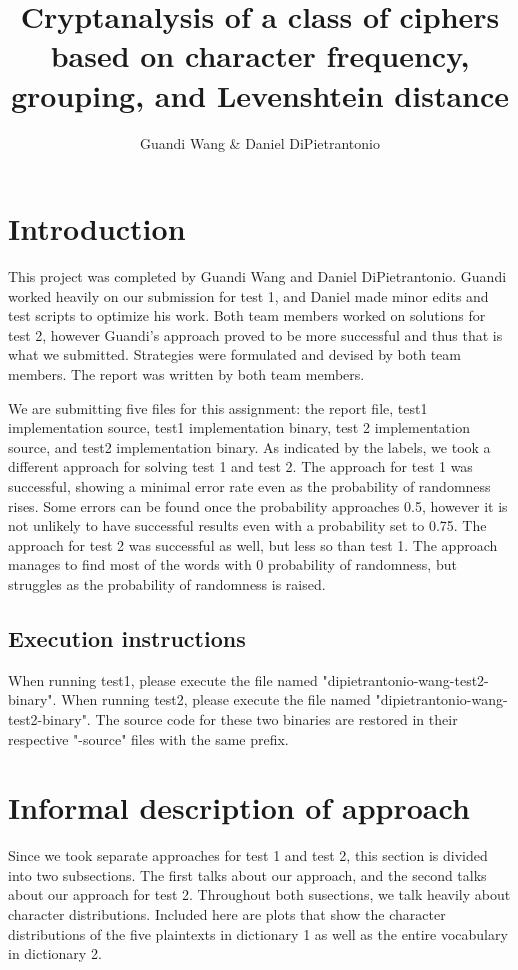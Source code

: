 \documentclass[12pt]{article}
\begin{document}
\title{Cryptanalysis of a class of ciphers based on character frequency, grouping, and Levenshtein distance}
\author{Guandi Wang \& Daniel DiPietrantonio}
\maketitle

\pagebreak

\section{Introduction}
This project was completed by Guandi Wang and Daniel DiPietrantonio. Guandi worked heavily on our submission for test 1, and Daniel made minor edits and test scripts to optimize his work. Both team members worked on solutions for test 2, however Guandi's approach proved to be more successful and thus that is what we submitted. Strategies were formulated and devised by both team members. The report was written by both team members.

We are submitting five files for this assignment: the report file, test1 implementation source, test1 implementation binary, test 2 implementation source, and test2 implementation binary. As indicated by the labels, we took a different approach for solving test 1 and test 2. The approach for test 1 was successful, showing a minimal error rate even as the probability of randomness rises. Some errors can be found once the probability approaches 0.5, however it is not unlikely to have successful results even with a probability set to 0.75. The approach for test 2 was successful as well, but less so than test 1. The approach manages to find most of the words with 0 probability of randomness, but struggles as the probability of randomness is raised.

\subsection{Execution instructions}
When running test1, please execute the file named "dipietrantonio-wang-test2-binary". When running test2, please execute the file named "dipietrantonio-wang-test2-binary". The source code for these two binaries are restored in their respective "-source" files with the same prefix.

\section{Informal description of approach}
Since we took separate approaches for test 1 and test 2, this section is divided into two subsections. The first talks about our approach, and the second talks about our approach for test 2. Throughout both susections, we talk heavily about character distributions. Included here are plots that show the character distributions of the five plaintexts in dictionary 1 as well as the entire vocabulary in dictionary 2.
\end{document}
